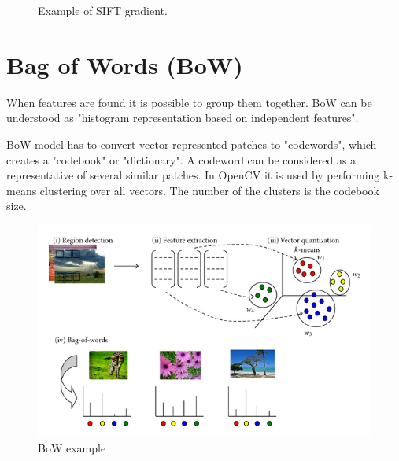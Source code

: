 \documentclass[a4paper, 11pt]{article}
\begin{document}
\begin{figure}[!htbp]
  \centering
  \hfill
  \hfill
  \caption{Example of SIFT gradient.}
\end{figure}


\section*{Bag of Words (BoW)}
When features are found it is possible to group them together. BoW can be understood as "histogram representation based on independent features". 

BoW model has to convert vector-represented patches to "codewords", which creates a "codebook" or "dictionary". A codeword can be considered as a representative of several similar patches. In OpenCV it is used by performing k-means clustering over all vectors. The number of the clusters is the codebook size.

\begin{figure}[!htbp]
\includegraphics[scale=3]{bow.jpg}
\centering
\caption{BoW example}
\end{figure}
\end{document}
